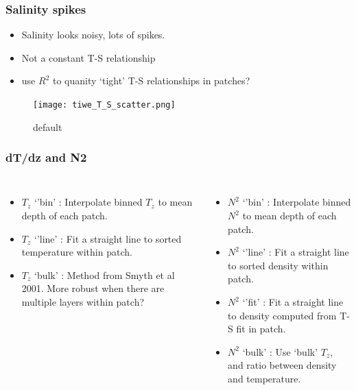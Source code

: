 \documentclass{beamer}
\begin{document}
\begin{frame}
 \frametitle{Salinity spikes}
\begin{itemize}
\item Salinity looks noisy, lots of spikes.
\item Not a constant T-S relationship 
\item use $R^2$ to quanity `tight' T-S relationships in patches?
\end{itemize}


\begin{figure}[htbp]
\begin{center}
\texttt{[image: tiwe\_T\_S\_scatter.png]}
\caption{default}
\label{default}
\end{center}
\end{figure}


\end{frame}




\begin{frame}
 \frametitle{dT/dz and N2}
 
 
\begin{columns}
\begin{itemize}
\item $T_z$ `'bin' : Interpolate binned $T_z$ to mean depth of each patch.
\item $T_z$ `'line' : Fit a straight line to sorted temperature within patch.
\item $T_z$ `bulk' : Method from Smyth et al 2001. More robust when there are multiple layers within patch?
\end{itemize}

\begin{itemize}
\item $N^2$ `'bin' : Interpolate binned $N^2$ to mean depth of each patch.
\item $N^2$ `'line' : Fit a straight line to sorted density within patch.
\item $N^2$ `'fit' : Fit a straight line to density computed from T-S fit in patch.
\item $N^2$ `bulk' : Use `bulk' $T_z$, and ratio between density and temperature.
\end{itemize}

\end{columns}

\end{frame}
\end{document}
